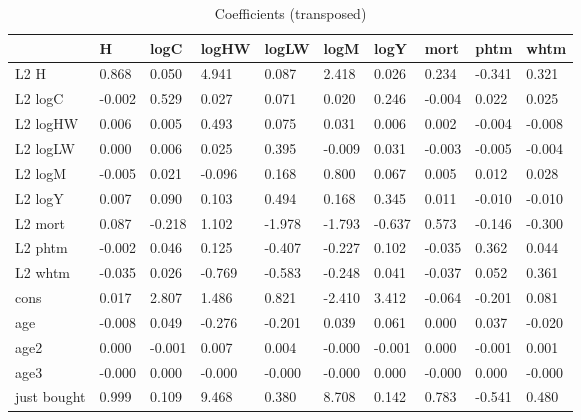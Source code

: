 \begin{table}[htbp]
\caption{\label{clabel} Coefficients (transposed)}\centering\medskip
\begin{tabular}{llllllllll} \hline \hline
 & H  & logC  & logHW  & logLW  & logM  & logY  & mort  & phtm  & whtm  \\  \hline 
L2 H &     0.868 &     0.050 &     4.941 &     0.087 &     2.418 &     0.026 &     0.234 &    -0.341 &     0.321 \\  
L2 logC &    -0.002 &     0.529 &     0.027 &     0.071 &     0.020 &     0.246 &    -0.004 &     0.022 &     0.025 \\  
L2 logHW &     0.006 &     0.005 &     0.493 &     0.075 &     0.031 &     0.006 &     0.002 &    -0.004 &    -0.008 \\  
L2 logLW &     0.000 &     0.006 &     0.025 &     0.395 &    -0.009 &     0.031 &    -0.003 &    -0.005 &    -0.004 \\  
L2 logM &    -0.005 &     0.021 &    -0.096 &     0.168 &     0.800 &     0.067 &     0.005 &     0.012 &     0.028 \\  
L2 logY &     0.007 &     0.090 &     0.103 &     0.494 &     0.168 &     0.345 &     0.011 &    -0.010 &    -0.010 \\  
L2 mort &     0.087 &    -0.218 &     1.102 &    -1.978 &    -1.793 &    -0.637 &     0.573 &    -0.146 &    -0.300 \\  
L2 phtm &    -0.002 &     0.046 &     0.125 &    -0.407 &    -0.227 &     0.102 &    -0.035 &     0.362 &     0.044 \\  
L2 whtm &    -0.035 &     0.026 &    -0.769 &    -0.583 &    -0.248 &     0.041 &    -0.037 &     0.052 &     0.361 \\  
cons &     0.017 &     2.807 &     1.486 &     0.821 &    -2.410 &     3.412 &    -0.064 &    -0.201 &     0.081 \\  
age &    -0.008 &     0.049 &    -0.276 &    -0.201 &     0.039 &     0.061 &     0.000 &     0.037 &    -0.020 \\  
age2 &     0.000 &    -0.001 &     0.007 &     0.004 &    -0.000 &    -0.001 &     0.000 &    -0.001 &     0.001 \\  
age3 &    -0.000 &     0.000 &    -0.000 &    -0.000 &    -0.000 &     0.000 &    -0.000 &     0.000 &    -0.000 \\  
just bought &     0.999 &     0.109 &     9.468 &     0.380 &     8.708 &     0.142 &     0.783 &    -0.541 &     0.480 \\  
\hline \hline \end{tabular}
\end{table}
